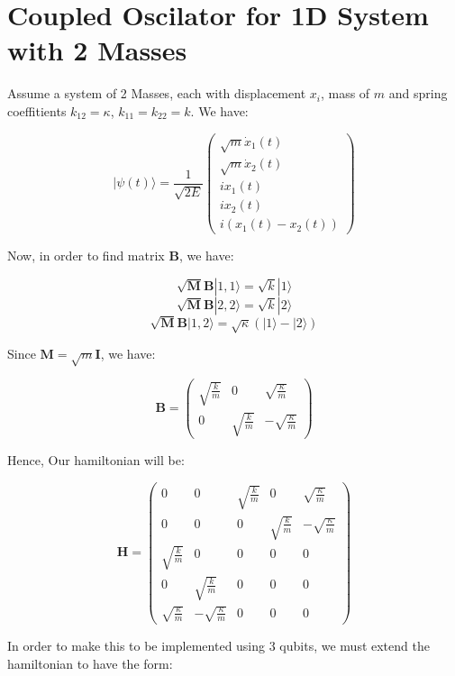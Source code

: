 \documentclass{article}
\begin{document}
\section*{Coupled Oscilator for 1D System with 2 Masses}

Assume a system of 2 Masses, each with displacement $x_i$, mass of $m$ and spring coeffitients $k_{12} = \kappa$, $k_{11} = k_{22} = k$. We have:

$$| \psi(t) \rangle = \frac{1}{\sqrt{2E}}\begin{pmatrix}
    \sqrt{m}\dot{x}_1(t) \\
    \sqrt{m}\dot{x}_2(t) \\
    ix_1(t) \\
    ix_2(t) \\
    i(x_1(t) - x_2(t))
\end{pmatrix}$$

Now, in order to find matrix $\textbf{B}$, we have:

$$\sqrt{\textbf{M}}\textbf{B}|1,1\rangle = \sqrt{k}|1\rangle$$
$$\sqrt{\textbf{M}}\textbf{B}|2,2\rangle = \sqrt{k}|2\rangle$$
$$\sqrt{\textbf{M}}\textbf{B}|1,2\rangle = \sqrt{\kappa}(|1\rangle - |2\rangle)$$

Since $\textbf{M} = \sqrt{m}\textbf{I}$, we have:

$$\textbf{B} = \begin{pmatrix}
    \sqrt{\frac{k}{m}} & 0 & \sqrt{\frac{\kappa}{m}} \\
    0 & \sqrt{\frac{k}{m}} & -\sqrt{\frac{\kappa}{m}}
\end{pmatrix}$$

Hence, Our hamiltonian will be:

$$\textbf{H} = \begin{pmatrix}
    0 & 0 & \sqrt{\frac{k}{m}} & 0 & \sqrt{\frac{\kappa}{m}} \\
    0 & 0 & 0 & \sqrt{\frac{k}{m}} & -\sqrt{\frac{\kappa}{m}} \\
    \sqrt{\frac{k}{m}} & 0 & 0 & 0 & 0 \\
    0 & \sqrt{\frac{k}{m}} & 0 & 0 & 0 \\
    \sqrt{\frac{\kappa}{m}} & -\sqrt{\frac{\kappa}{m}} & 0 & 0 & 0
\end{pmatrix}$$

In order to make this to be implemented using 3 qubits, we must extend the hamiltonian to have the form:
\end{document}
